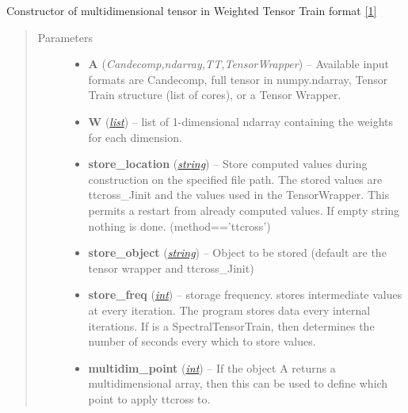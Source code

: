 \documentclass[a4paper,10pt,english]{sphinxmanual}
\begin{document}
\begin{fulllineitems}
\label{api-core:TensorToolbox.core.WTTvec}
Constructor of multidimensional tensor in Weighted Tensor Train format {\hyperref[zrefs:oseledets2011]{{[}1{]}}}
\begin{quote}\begin{description}
\item[{Parameters}] \leavevmode\begin{itemize}
\item {} 
\textbf{A} (\emph{Candecomp,ndarray,TT,TensorWrapper}) -- Available input formats are Candecomp, full tensor in numpy.ndarray, Tensor Train structure (list of cores), or a Tensor Wrapper.

\item {} 
\textbf{W} (\href{http://docs.python.org/library/functions.html\#list}{\emph{list}}) -- list of 1-dimensional ndarray containing the weights for each dimension.

\item {} 
\textbf{store\_location} (\href{http://docs.python.org/library/string.html\#module-string}{\emph{string}}) -- Store computed values during construction on the specified file path. The stored values are ttcross\_Jinit and the values used in the TensorWrapper. This permits a restart from already computed values. If empty string nothing is done. (method=='ttcross')

\item {} 
\textbf{store\_object} (\href{http://docs.python.org/library/string.html\#module-string}{\emph{string}}) -- Object to be stored (default are the tensor wrapper and ttcross\_Jinit)

\item {} 
\textbf{store\_freq} (\href{http://docs.python.org/library/functions.html\#int}{\emph{int}}) -- storage frequency.  stores intermediate values at every iteration. The program stores data every  internal iterations. If  is a SpectralTensorTrain, then  determines the number of seconds every which to store values.

\item {} 
\textbf{multidim\_point} (\href{http://docs.python.org/library/functions.html\#int}{\emph{int}}) -- If the object A returns a multidimensional array, then this can be used to define which point to apply ttcross to.


\end{itemize}
\end{description}
\end{quote}
\end{fulllineitems}
\end{document}
